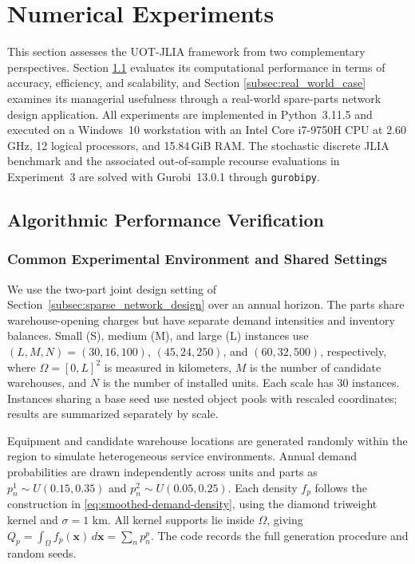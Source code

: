 \documentclass[a4paper,fleqn]{cas-sc}
\theoremstyle{remark}
\theoremstyle{plain}
\begin{document}
\section{Numerical Experiments}\label{sec:experiments}

This section assesses the UOT-JLIA framework from two complementary perspectives. Section \ref{subsec:algo-verification} evaluates its computational performance in terms of accuracy, efficiency, and scalability, and Section \ref{subsec:real_world_case} examines its managerial usefulness through a real-world spare-parts network design application. All experiments are implemented in Python~3.11.5 and executed on a Windows~10 workstation with an Intel Core i7-9750H CPU at 2.60\,GHz, 12 logical processors, and 15.84\,GiB RAM. The stochastic discrete JLIA benchmark and the associated out-of-sample recourse evaluations in Experiment~3 are solved with Gurobi~13.0.1 through \texttt{gurobipy}.

\subsection{Algorithmic Performance Verification}\label{subsec:algo-verification}

\subsubsection*{Common Experimental Environment and Shared Settings}

We use the two-part joint design setting of Section~\ref{subsec:sparse_network_design} over an annual horizon. The parts share warehouse-opening charges but have separate demand intensities and inventory balances. Small (S), medium (M), and large (L) instances use $(L,M,N)=(30,16,100)$, $(45,24,250)$, and $(60,32,500)$, respectively, where $\Omega=[0,L]^2$ is measured in kilometers, $M$ is the number of candidate warehouses, and $N$ is the number of installed units. Each scale has 30 instances. Instances sharing a base seed use nested object pools with rescaled coordinates; results are summarized separately by scale.

Equipment and candidate warehouse locations are generated randomly within the region to simulate heterogeneous service environments. Annual demand probabilities are drawn independently across units and parts as $p_n^1\sim U(0.15,0.35)$ and $p_n^2\sim U(0.05,0.25)$. Each density $f_p$ follows the construction in \eqref{eq:smoothed-demand-density}, using the diamond triweight kernel and $\sigma=1$ km. All kernel supports lie inside $\Omega$, giving $Q_p=\int_\Omega f_p(\bm x)\,d\bm x=\sum_n p_n^p$. The code records the full generation procedure and random seeds.
\end{document}
